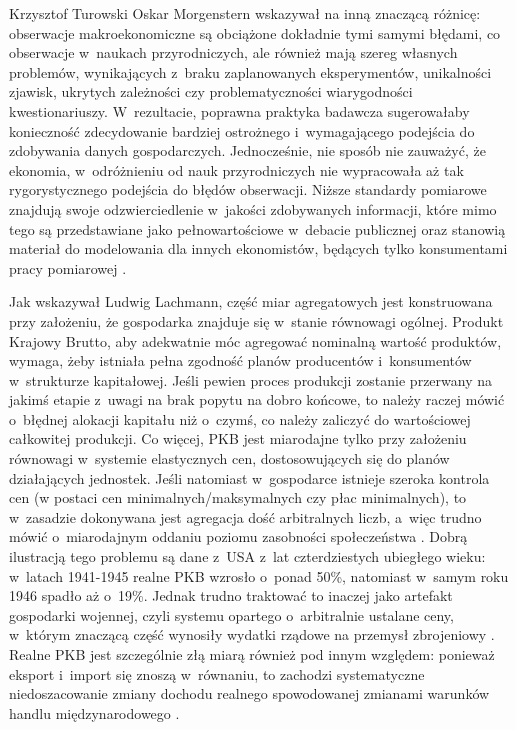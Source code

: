 \begin{artplenv}{Krzysztof Turowski}
Oskar Morgenstern wskazywał na inną znaczącą różnicę: obserwacje makroekonomiczne są obciążone dokładnie tymi samymi
błędami, co obserwacje w~naukach przyrodniczych, ale również mają szereg własnych problemów, wynikających z~braku
zaplanowanych eksperymentów, unikalności zjawisk, ukrytych zależności czy problematyczności wiarygodności
kwestionariuszy. W~rezultacie, poprawna praktyka badawcza sugerowałaby konieczność zdecydowanie bardziej
ostrożnego i~wymagającego podejścia do zdobywania danych gospodarczych. Jednocześnie, nie sposób nie zauważyć,
że ekonomia, w~odróżnieniu od nauk przyrodniczych nie wypracowała aż tak rygorystycznego podejścia do błędów obserwacji. Niższe
standardy pomiarowe znajdują swoje odzwierciedlenie w~jakości zdobywanych informacji, które mimo tego są przedstawiane
jako pełnowartościowe w~debacie publicznej oraz stanowią materiał do modelowania dla innych ekonomistów, będących tylko
konsumentami pracy pomiarowej
\parencite{morgenstern_accuracy_1963}.

Jak wskazywał Ludwig Lachmann, część miar agregatowych jest konstruowana przy założeniu, że gospodarka znajduje
się w~stanie równowagi ogólnej. Produkt Krajowy Brutto, aby adekwatnie móc agregować nominalną wartość produktów, wymaga,
żeby istniała pełna zgodność planów producentów i~konsumentów w~strukturze kapitałowej. Jeśli pewien proces produkcji
zostanie przerwany na jakimś etapie z~uwagi na brak popytu na dobro końcowe, to należy raczej mówić o~błędnej alokacji
kapitału niż o~czymś, co należy zaliczyć do wartościowej całkowitej produkcji. Co więcej, PKB jest miarodajne tylko
przy założeniu równowagi w~systemie elastycznych cen, dostosowujących się do planów działających jednostek. Jeśli
natomiast w~gospodarce istnieje szeroka kontrola cen (w postaci cen minimalnych/maksymalnych czy płac minimalnych), to
w~zasadzie dokonywana jest agregacja dość arbitralnych liczb, a~więc trudno mówić o~miarodajnym oddaniu poziomu
zasobności społeczeństwa
\parencite{lachmann_macro-economic_1973}.
Dobrą ilustracją tego problemu są dane z~USA z~lat
czterdziestych ubiegłego wieku: w~latach 1941-1945 realne PKB wzrosło o~ponad 50\%, natomiast w~samym roku 1946 spadło
aż o~19\%. Jednak trudno traktować to inaczej jako artefakt gospodarki wojennej, czyli systemu opartego o~arbitralnie
ustalane ceny, w~którym znaczącą część wynosiły wydatki rządowe na przemysł zbrojeniowy
\parencite{vedder_great_1991}.
Realne PKB jest szczególnie złą miarą również pod innym względem:
ponieważ eksport i~import się znoszą w~równaniu, to zachodzi systematyczne niedoszacowanie zmiany dochodu realnego
spowodowanej zmianami warunków handlu międzynarodowego
\parencite{kohli_real_2004}.


\end{artplenv}

